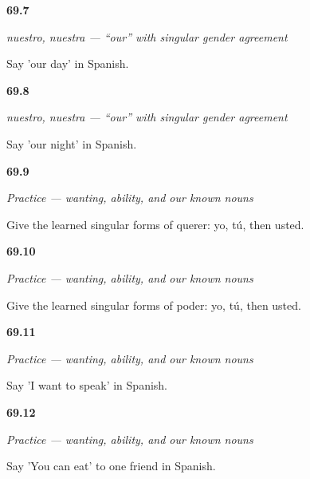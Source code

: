 \noindent\begin{minipage}[t]{\linewidth}
\raggedright
\hypertarget{review-ES-C11-nuestro-our-day}{\textbf{69.7}} \emph{nuestro, nuestra — “our” with singular gender agreement}\par
\small Say 'our day' in Spanish.
\end{minipage}\par\medskip

\noindent\begin{minipage}[t]{\linewidth}
\raggedright
\hypertarget{review-ES-C11-nuestro-our-night}{\textbf{69.8}} \emph{nuestro, nuestra — “our” with singular gender agreement}\par
\small Say 'our night' in Spanish.
\end{minipage}\par\medskip

\noindent\begin{minipage}[t]{\linewidth}
\raggedright
\hypertarget{review-ES-C11-practice-querer-forms}{\textbf{69.9}} \emph{Practice — wanting, ability, and our known nouns}\par
\small Give the learned singular forms of querer: yo, tú, then usted.
\end{minipage}\par\medskip

\noindent\begin{minipage}[t]{\linewidth}
\raggedright
\hypertarget{review-ES-C11-practice-poder-forms}{\textbf{69.10}} \emph{Practice — wanting, ability, and our known nouns}\par
\small Give the learned singular forms of poder: yo, tú, then usted.
\end{minipage}\par\medskip

\noindent\begin{minipage}[t]{\linewidth}
\raggedright
\hypertarget{review-ES-C11-practice-want-to-speak}{\textbf{69.11}} \emph{Practice — wanting, ability, and our known nouns}\par
\small Say 'I want to speak' in Spanish.
\end{minipage}\par\medskip

\noindent\begin{minipage}[t]{\linewidth}
\raggedright
\hypertarget{review-ES-C11-practice-can-eat}{\textbf{69.12}} \emph{Practice — wanting, ability, and our known nouns}\par
\small Say 'You can eat' to one friend in Spanish.
\end{minipage}\par\medskip

